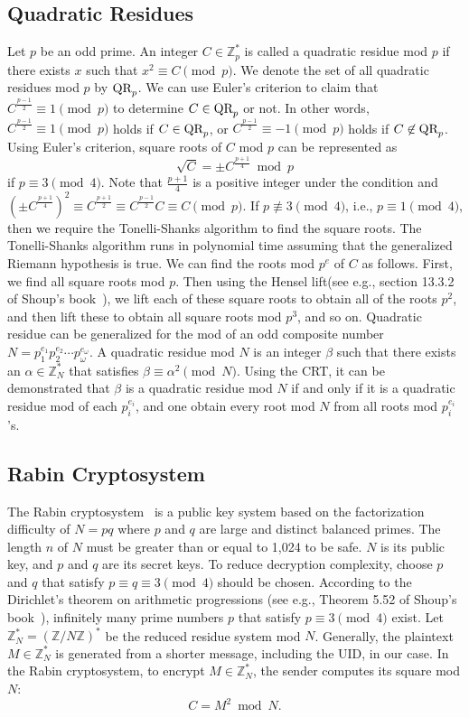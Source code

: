 \documentclass{article}
\newcommand{\QR}{\text{\rm QR}}
\begin{document}
\subsection{Quadratic Residues}
Let $p$ be an odd prime. 
An integer $C\in\mathbb{Z}_p^*$ is called a quadratic residue mod $p$ if 
there exists $x$ such that $x^2\equiv C\pmod{p}$. 
We denote the set of all quadratic residues mod $p$ by $\QR_p$.
We can use 
Euler's criterion to claim that $C^{\frac{p-1}{2}}\equiv 1\pmod{p}$ 
to determine $C\in\QR_p$ or not.
In other words, $C^{\frac{p-1}{2}}\equiv 1\pmod{p}$ holds if $C\in\QR_p$, or 
$C^{\frac{p-1}{2}}\equiv -1\pmod{p}$ holds if $C\not\in\QR_p$.
Using Euler's criterion, square roots of $C$ mod $p$ can be represented as 
$$
\sqrt{C}=\pm C^{\frac{p+1}{4}}\bmod p
$$
if $p\equiv 3\pmod{4}$. 
Note that $\frac{p+1}{4}$ is a positive integer under the condition 
and $(\pm C^{\frac{p+1}{4}})^2\equiv C^{\frac{p+1}{2}}\equiv C^{\frac{p-1}{2}}C\equiv C\pmod{p}$.
If $p\not\equiv 3\pmod{4}$, i.e., $p\equiv 1\pmod{4}$, 
then we require the Tonelli-Shanks algorithm to find the square roots. 
The Tonelli-Shanks algorithm runs in polynomial time 
assuming that the generalized Riemann hypothesis is true. 
We can find the roots mod $p^e$ of $C$ as follows. 
First, we find all square roots mod $p$. 
Then using the Hensel lift(see e.g., section 13.3.2 of Shoup's book~\cite{Shoup}), we 
lift each of these square roots to obtain all of the roots $p^2$, 
and then lift these to obtain all square roots 
mod $p^3$, and so on.
Quadratic residue can be generalized for the mod of 
an odd composite number $N=p_1^{e_1}p_2^{e_2}\cdots p_{\omega}^{e_{\omega}}$. 
A quadratic residue mod $N$ is an integer $\beta$ such that there exists an $\alpha\in\mathbb{Z}_N^*$ 
that satisfies $\beta\equiv \alpha^2\pmod{N}$. 
Using the CRT, it can be demonstrated that $\beta$ is a quadratic residue mod $N$ 
if and only if it is a quadratic residue mod of each $p_i^{e_i}$, and one obtain every root mod $N$ 
from all roots mod $p_i^{e_i}$'s. 



\subsection{Rabin Cryptosystem}\label{Rabin}
The Rabin cryptosystem~\cite{Rabin} is a public key system based on the factorization 
difficulty of $N=pq$ where $p$ and $q$ are large and distinct balanced primes. 
The length $n$ of $N$ must be greater than or equal to 1,024 to be safe.
$N$ is its public key, and $p$ and $q$ are its secret keys. 
To reduce decryption complexity, choose $p$ and $q$ that satisfy 
$p\equiv q\equiv 3\pmod{4}$ should be chosen. 
According to the Dirichlet's theorem on arithmetic progressions
(see e.g., Theorem 5.52 of Shoup's book~\cite{Shoup}), 
infinitely many prime numbers $p$ that satisfy $p\equiv 3\pmod{4}$ exist. 
Let $\mathbb{Z}_N^*=(\mathbb{Z}/N\mathbb{Z})^*$ be the reduced residue system mod $N$.
Generally, the plaintext $M\in\mathbb{Z}_N^*$ is generated from a shorter message, including 
the UID, in our case. 
In the Rabin cryptosystem, to encrypt $M\in\mathbb{Z}_N^*$, the sender computes its square mod $N$:
$$
C = M^2 \bmod N.
$$ 
\end{document}
